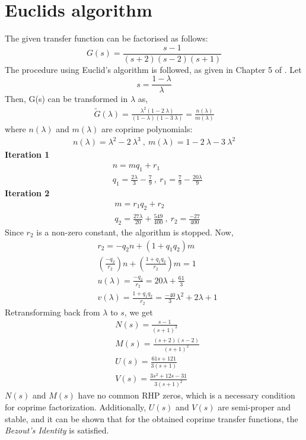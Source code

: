 \section{Euclids algorithm}
The given transfer function can be factorised as follows:
\begin{equation}
G(s) = \frac{s-1}{(s+2)(s-2)(s+1)}
 \label{eq:G}
\end{equation}
The procedure using Euclid's algorithm is followed, as given in Chapter 5 of \cite{Doyle90}. Let $$s = \frac{1-\lambda}{\lambda}$$
Then, G(s) can be transformed in $\lambda$ as,
\begin{align*}
    \tilde{G}(\lambda) = \frac{\lambda^2(1-2\:\lambda)}{(1-\lambda)(1-3\:\lambda)}
    = \frac{n(\lambda)}{m(\lambda)}
\end{align*}
where $n(\lambda)$ and $m(\lambda)$ are coprime polynomials:
\begin{align*}
n(\lambda) = \lambda^2 - 2\:\lambda^3 \:,\: m(\lambda) = 1-2\:\lambda-3\:\lambda^2
\end{align*}
\textbf{Iteration 1}
\begin{align*}
    &n=mq_1 + r_1\\
    &q_1 = \frac{2\lambda}{3} - \frac{7}{9}\: ,\: r_1 = \frac{7}{9} - \frac{20\lambda}{9}   
\end{align*}
\textbf{Iteration 2}
\begin{align*}
    &m=r_1q_2 + r_2\\
    &q_2 = \frac{27\lambda}{20} + \frac{549}{400}\: ,\: r_2 = \frac{-27}{400}   
\end{align*}
Since $r_2$ is a non-zero constant, the algorithm is stopped.
Now,
\begin{align*}
    &r_2 = -q_2n + (1 + q_1q_2)m\\
    &\left(\frac{-q_2}{r_2}\right)n + \left(\frac{1 + q_1q_2}{r_2}\right)m = 1\\
    &u(\lambda) = \frac{-q_2}{r_2} = 20\lambda + \frac{61}{3}\\
    &v(\lambda) = \frac{1 + q_1q_2}{r_2} =\frac{-40}{3}\lambda^2+2\lambda+1
\end{align*}
Retransforming back from $\lambda$ to $s$, we get
\begin{align*}
    &N(s) = \frac{s-1}{(s+1)^3}\\
    &M(s) = \frac{(s+2)(s-2)}{(s+1)^2}\\
    &U(s) = \frac{61s+121}{3(s+1)}\\
    &V(s) = \frac{3s^2+12s-31}{3(s+1)^2}
\end{align*}
$N(s)$ and $M(s)$ have no common RHP zeros, which is a necessary condition for coprime factorization. Additionally, $U(s)$ and $V(s)$ are semi-proper and stable, and it can be shown that for the obtained coprime transfer functions, the \emph{Bezout's Identity} is satisfied.\\

